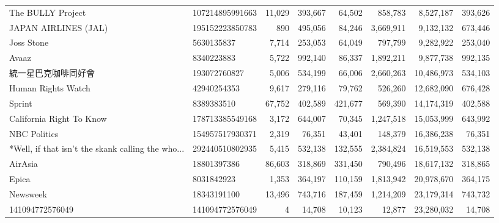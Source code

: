 \begin{longtable}{llrrrrrr}
                                 The BULLY Project &  107214895991663 &  11,029 &     393,667 &     64,502 &     858,783 &   8,527,187 &   393,626 \\
                              JAPAN AIRLINES (JAL) &  195152223850783 &     890 &     495,056 &     84,246 &   3,669,911 &   9,132,132 &   673,446 \\
                                        Joss Stone &       5630135837 &   7,714 &     253,053 &     64,049 &     797,799 &   9,282,922 &   253,040 \\
                                             Avaaz &       8340223883 &   5,722 &     992,140 &     86,337 &   1,892,211 &   9,877,738 &   992,135 \\
                                        統一星巴克咖啡同好會 &     193072760827 &   5,006 &     534,199 &     66,006 &   2,660,263 &  10,486,973 &   534,103 \\
                                Human Rights Watch &      42940254353 &   9,617 &     279,116 &     79,762 &     526,260 &  12,682,090 &   676,428 \\
                                            Sprint &       8389383510 &  67,752 &     402,589 &    421,677 &     569,390 &  14,174,319 &   402,588 \\
                          California Right To Know &  178713385549168 &   3,172 &     644,007 &     70,345 &   1,247,518 &  15,053,999 &   643,992 \\
                                      NBC Politics &  154957517930371 &   2,319 &      76,351 &     43,401 &     148,379 &  16,386,238 &    76,351 \\
 *Well, if that isn't the skank calling the who... &  292440510802935 &   5,415 &     532,138 &    132,555 &   2,384,824 &  16,519,553 &   532,138 \\
                                           AirAsia &      18801397386 &  86,603 &     318,869 &    331,450 &     790,496 &  18,617,132 &   318,865 \\
                                             Epica &       8031842923 &   1,353 &     364,197 &    110,159 &   1,813,942 &  20,978,670 &   364,175 \\
                                          Newsweek &      18343191100 &  13,496 &     743,716 &    187,459 &   1,214,209 &  23,179,314 &   743,732 \\
                                   141094772576049 &  141094772576049 &       4 &      14,708 &     10,123 &      12,877 &  23,280,032 &    14,708 \\

\end{longtable}
